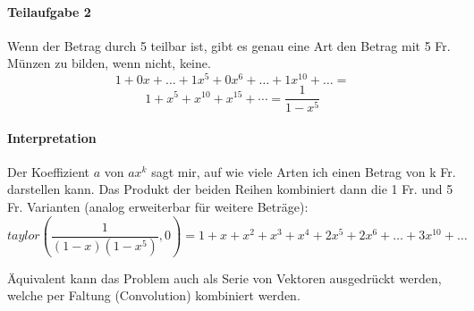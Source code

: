 \documentclass[10pt,a4paper]{scrartcl}
\begin{document}
\paragraph{Teilaufgabe 2} Wenn der Betrag durch 5 teilbar ist, gibt es genau eine Art den Betrag mit 5 Fr. Münzen zu bilden, wenn nicht, keine.
$$1 + 0x + \dots + 1x^5 + 0x^6 + \dots + 1x^{10} + \dots = $$ $$1 + x^5 + x^{10} + x^{15} + \cdots = \frac{1}{1-x^5}$$

\paragraph{Interpretation}
Der Koeffizient $a$ von $ax^k$ sagt mir, auf wie viele Arten ich einen Betrag von k Fr. darstellen kann. Das Produkt der beiden Reihen kombiniert dann die 1 Fr. und 5 Fr. Varianten (analog erweiterbar für weitere Beträge):
$$taylor\left(\frac{1}{(1-x)(1-x^5)}, 0\right) = 1 + x + x^2 + x^3 + x^4 + 2x^5 + 2x^6 + \dots + 3x^{10} + \dots$$

Äquivalent kann das Problem auch als Serie von Vektoren ausgedrückt werden, welche per Faltung (Convolution) kombiniert werden.
\end{document}
